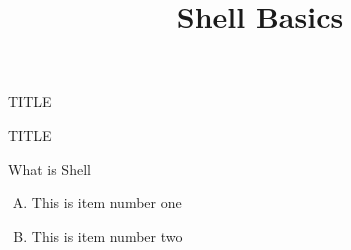 \documentclass{beamer}
\title[Shell Basics]{Shell Basics}
\author{}
\institute{\large \textbf{Learning outcomes}:\\[6pt]Identify}
\date{}
\begin{document}

\begin{frame}
\titlepage
\end{frame}

\begin{frame}[t]{TITLE}\vspace{10pt}
\begin{block}{TITLE}
\vspace{0.5em}
\vspace{0.5em}
\end{block}

\vspace{0.5em}


\end{frame}

\begin{frame}[t]{What is Shell}\vspace{10pt}
\begin{enumerate}[(A)]
\item This is item number one
\item This is item number two
\end{enumerate}
\end{frame}
\end{document}
